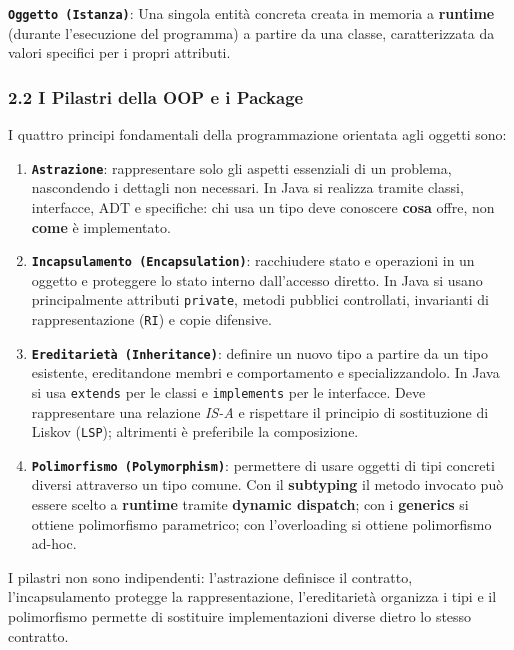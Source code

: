 \textbf{\texttt{Oggetto (Istanza)}}: Una singola entità concreta creata in memoria a \textbf{runtime} (durante l'esecuzione del programma) a partire da una classe, caratterizzata da valori specifici per i propri attributi.

\subsubsection{2.2 I Pilastri della OOP e i Package}\label{2-2-i-pilastri-della-oop-e-i-package}

I quattro principi fondamentali della programmazione orientata agli oggetti sono:

\begin{enumerate}
\item \textbf{\texttt{Astrazione}}: rappresentare solo gli aspetti essenziali di un problema, nascondendo i dettagli non necessari. In Java si realizza tramite classi, interfacce, ADT e specifiche: chi usa un tipo deve conoscere \textbf{cosa} offre, non \textbf{come} è implementato.

\item \textbf{\texttt{Incapsulamento (Encapsulation)}}: racchiudere stato e operazioni in un oggetto e proteggere lo stato interno dall'accesso diretto. In Java si usano principalmente attributi \texttt{private}, metodi pubblici controllati, invarianti di rappresentazione (\texttt{RI}) e copie difensive.

\item \textbf{\texttt{Ereditarietà (Inheritance)}}: definire un nuovo tipo a partire da un tipo esistente, ereditandone membri e comportamento e specializzandolo. In Java si usa \texttt{extends} per le classi e \texttt{implements} per le interfacce. Deve rappresentare una relazione \emph{IS-A} e rispettare il principio di sostituzione di Liskov (\texttt{LSP}); altrimenti è preferibile la composizione.

\item \textbf{\texttt{Polimorfismo (Polymorphism)}}: permettere di usare oggetti di tipi concreti diversi attraverso un tipo comune. Con il \textbf{subtyping} il metodo invocato può essere scelto a \textbf{runtime} tramite \textbf{dynamic dispatch}; con i \textbf{generics} si ottiene polimorfismo parametrico; con l'overloading si ottiene polimorfismo ad-hoc.
\end{enumerate}

I pilastri non sono indipendenti: l'astrazione definisce il contratto, l'incapsulamento protegge la rappresentazione, l'ereditarietà organizza i tipi e il polimorfismo permette di sostituire implementazioni diverse dietro lo stesso contratto.

